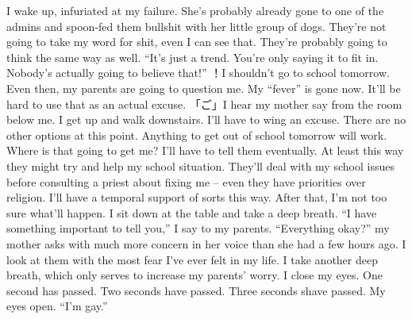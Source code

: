 \documentclass[a4paper, 12pt]{book}
\begin{document}
\begin{CJK*}{UTF8}{min}
\newline
\tab
I wake up, infuriated at my failure. She’s probably already gone to one of the admins and spoon-fed them bullshit with her little group of dogs. They’re not going to take my word for shit, even I can see that. They’re probably going to think the same way as well. ``It’s just a trend. You’re only saying it to fit in. Nobody’s actually going to believe that!'' ！I shouldn’t go to school tomorrow. Even then, my parents are going to question me. My ``fever'' is gone now. It’ll be hard to use that as an actual excuse.
\newline
\tab
「ご」I hear my mother say from the room below me. I get up and walk downstairs. I’ll have to wing an excuse. There are no other options at this point. Anything to get out of school tomorrow will work. Where is that going to get me? I’ll have to tell them eventually. At least this way they might try and help my school situation. They’ll deal with my school issues before consulting a priest about fixing me -- even they have priorities over religion. I’ll have a temporal support of sorts this way. After that, I’m not too sure what’ll happen.
\newline
\tab
I sit down at the table and take a deep breath. ``I have something important to tell you,'' I say to my parents.
\newline
\tab
``Everything okay?'' my mother asks with much more concern in her voice than she had a few hours ago. 
\newline
\tab
I look at them with the most fear I’ve ever felt in my life. I take another deep breath, which only serves to increase my parents’ worry. I close my eyes. One second has passed. Two seconds have passed. Three seconds shave passed. My eyes open. ``I’m gay.''
\end{CJK*}
\end{document}

